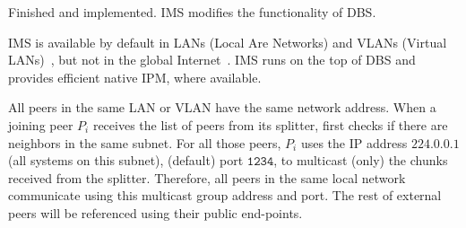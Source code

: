 
\label{sec:IMS}

\begin{notex}
  Finished and implemented. IMS modifies the functionality of DBS.
\end{notex}

IMS is available by default in LANs (Local Are Networks) and VLANs
(Virtual LANs)~\cite{shabtay2011ip}, but not in the global
Internet~\cite{Comer1}. IMS runs on the top of DBS and provides
efficient native IPM, where available.

All peers in the same LAN or VLAN have the same network address. When
a joining peer $P_i$ receives the list of peers from its splitter,
first checks if there are neighbors in the same subnet. For all those
peers, $P_i$ uses the IP address $\mathtt{224.0.0.1}$ (all systems on
this subnet), (default) port $\mathtt{1234}$, to multicast (only) the
chunks received from the splitter. Therefore, all peers in the same
local network communicate using this multicast group address and
port. The rest of external peers will be referenced using their public
end-points.

